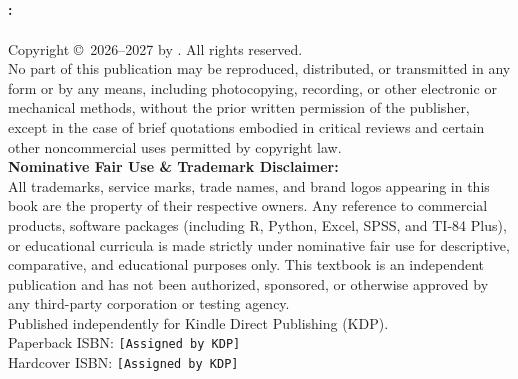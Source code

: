 ﻿%

\thispagestyle{empty}
\begin{center}
  \vspace*{2cm}
  {\Huge\bfseries\color{MidnightBlue} \BookTitle}\\[12pt]
  {\Large\color{DarkSlateGray} \BookSubtitle}\\[24pt]
  {\large\bfseries \BookSeries}\\[36pt]
  {\Large \BookAuthor}\\[24pt]
  {\normalsize \Edition}
\end{center}
\clearpage

\thispagestyle{empty}
\vspace*{\fill}
\begin{center}
  \begin{minipage}{0.9\linewidth}
    \small
    \textbf{\BookTitle: \BookSubtitle}\\
    \BookSeries\\[6pt]
    Copyright \copyright\ 2026--2027 by \BookAuthor. All rights reserved.\\[10pt]
    No part of this publication may be reproduced, distributed, or transmitted in any form or by any means, including photocopying, recording, or other electronic or mechanical methods, without the prior written permission of the publisher, except in the case of brief quotations embodied in critical reviews and certain other noncommercial uses permitted by copyright law.\\[10pt]
    \textbf{Nominative Fair Use \& Trademark Disclaimer:}\\
    All trademarks, service marks, trade names, and brand logos appearing in this book are the property of their respective owners. Any reference to commercial products, software packages (including R, Python, Excel, SPSS, and TI-84 Plus), or educational curricula is made strictly under nominative fair use for descriptive, comparative, and educational purposes only. This textbook is an independent publication and has not been authorized, sponsored, or otherwise approved by any third-party corporation or testing agency.\\[10pt]
    Published independently for Kindle Direct Publishing (KDP).\\
    Paperback ISBN: \texttt{[Assigned by KDP]}\\
    Hardcover ISBN: \texttt{[Assigned by KDP]}\\
  \end{minipage}
\end{center}
\vspace*{\fill}
\clearpage

